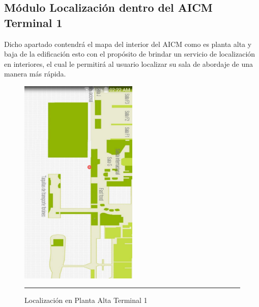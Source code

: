 \subsection{Módulo Localización dentro del AICM Terminal 1}
Dicho apartado contendrá el mapa del interior del AICM como es planta alta y baja de la edificación esto con el propósito de brindar un servicio de localización en interiores, 
el cual le permitirá al usuario localizar su sala de abordaje de una manera más rápida.

\begin{figure}[h]
	\centering
		\includegraphics[width=0.5\textwidth]{Figuras/ubikpa.jpg}
		\rule{30em}{0.5pt}
	\caption[Localización en Planta Alta Terminal 1]{Localización en Planta Alta Terminal 1}
	\label{fig:indoorPA}
\end{figure}

